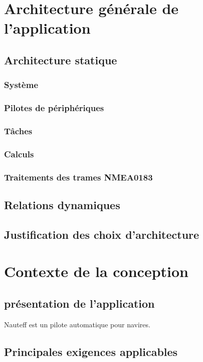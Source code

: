 \documentclass[a4paper,11pt]{report}
\begin{document}
\chapter{Architecture générale de l'application}
\section{Architecture statique}
\subsection{Système}
\subsection{Pilotes de périphériques}
\subsection{Tâches}
\subsection{Calculs}
\subsection{Traitements des trames NMEA0183}
\section{Relations dynamiques}


\section{Justification des choix d'architecture}

\chapter{Contexte de la conception}
\section{présentation de l'application}
Nauteff est un pilote automatique pour navires.
\section{Principales exigences applicables}
\end{document}
